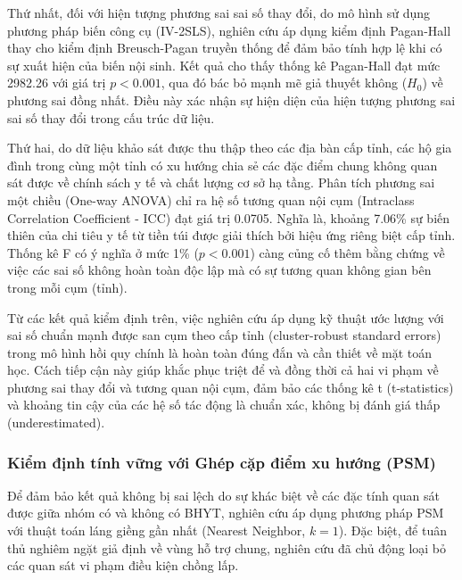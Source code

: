 \documentclass[12pt,a4paper]{article}
\begin{document}
Thứ nhất, đối với hiện tượng phương sai sai số thay đổi, do mô hình sử dụng phương pháp biến công cụ (IV-2SLS), nghiên cứu áp dụng kiểm định Pagan-Hall thay cho kiểm định Breusch-Pagan truyền thống để đảm bảo tính hợp lệ khi có sự xuất hiện của biến nội sinh. Kết quả cho thấy thống kê Pagan-Hall đạt mức 2982.26 với giá trị $p < 0.001$, qua đó bác bỏ mạnh mẽ giả thuyết không ($H_0$) về phương sai đồng nhất. Điều này xác nhận sự hiện diện của hiện tượng phương sai sai số thay đổi trong cấu trúc dữ liệu.

Thứ hai, do dữ liệu khảo sát được thu thập theo các địa bàn cấp tỉnh, các hộ gia đình trong cùng một tỉnh có xu hướng chia sẻ các đặc điểm chung không quan sát được về chính sách y tế và chất lượng cơ sở hạ tầng. Phân tích phương sai một chiều (One-way ANOVA) chỉ ra hệ số tương quan nội cụm (Intraclass Correlation Coefficient - ICC) đạt giá trị 0.0705. Nghĩa là, khoảng 7.06\% sự biến thiên của chi tiêu y tế từ tiền túi được giải thích bởi hiệu ứng riêng biệt cấp tỉnh. Thống kê F có ý nghĩa ở mức 1\% ($p < 0.001$) càng củng cố thêm bằng chứng về việc các sai số không hoàn toàn độc lập mà có sự tương quan không gian bên trong mỗi cụm (tỉnh).

Từ các kết quả kiểm định trên, việc nghiên cứu áp dụng kỹ thuật ước lượng với sai số chuẩn mạnh được san cụm theo cấp tỉnh (cluster-robust standard errors) trong mô hình hồi quy chính là hoàn toàn đúng đắn và cần thiết về mặt toán học. Cách tiếp cận này giúp khắc phục triệt để và đồng thời cả hai vi phạm về phương sai thay đổi và tương quan nội cụm, đảm bảo các thống kê t (t-statistics) và khoảng tin cậy của các hệ số tác động là chuẩn xác, không bị đánh giá thấp (underestimated).

\subsubsection{Kiểm định tính vững với Ghép cặp điểm xu hướng (PSM)}

Để đảm bảo kết quả không bị sai lệch do sự khác biệt về các đặc tính quan sát được giữa nhóm có và không có BHYT, nghiên cứu áp dụng phương pháp PSM với thuật toán láng giềng gần nhất (Nearest Neighbor, $k=1$). Đặc biệt, để tuân thủ nghiêm ngặt giả định về vùng hỗ trợ chung, nghiên cứu đã chủ động loại bỏ các quan sát vi phạm điều kiện chồng lấp.
\end{document}
